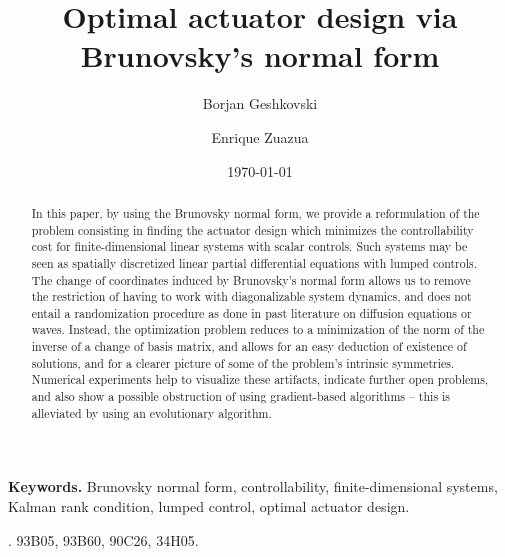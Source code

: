 \documentclass[11pt, a4paper, reqno]{amsart}
\title 
	[Optimal actuator design via Brunovsky's normal form]{Optimal actuator design via Brunovsky's normal form}
\author{Borjan Geshkovski}
\author{Enrique Zuazua}
\date{\today}
\theoremstyle{plain}
\numberwithin{equation}{section}
\begin{document}
	
		\begin{abstract}
		In this paper, by using the Brunovsky normal form, we provide a reformulation of the problem consisting in finding the actuator design which minimizes the controllability cost for finite-dimensional linear systems with scalar controls.
Such systems may be seen as spatially discretized linear partial differential equations with lumped controls. 
		The change of coordinates induced by Brunovsky's normal form allows us to remove the restriction of having to work with diagonalizable system dynamics, and does not entail a randomization procedure as done in past literature on diffusion equations or waves. 
		Instead, the optimization problem reduces to a minimization of the norm of the inverse of a change of basis matrix, and allows for an easy deduction of  existence of solutions, and for a clearer picture of some of the problem's intrinsic symmetries. 
		Numerical experiments help to visualize these artifacts, indicate further open problems, and also show a possible obstruction of using gradient-based algorithms -- this is alleviated by using an evolutionary algorithm.
		\end{abstract}
			
	\maketitle	
	
	\setcounter{tocdepth}{1}
	
	\tableofcontents
	
	{\small {\bf Keywords.} Brunovsky normal form, controllability, finite-dimensional systems, Kalman \indent rank condition, lumped control, optimal actuator design.}
	\smallskip

	{\small {\href{https://mathscinet.ams.org/msc/msc2010.html}{{\bf 	\color{dukeblue}{AMS Subject Classification}}}}. 93B05, 93B60, 	90C26, 34H05.}
	
\end{document}
